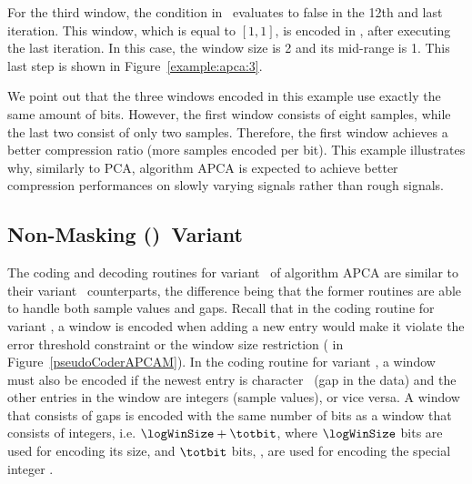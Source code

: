 For the third window, the condition in \Line \APCACodeOne\ evaluates to false in the 12th and last iteration. This window, which is equal to $[1, 1]$, is encoded in \Line \APCACodeTwo, after executing the last iteration. In this case, the window size is 2 and its mid-range is 1. This last step is shown in Figure~\ref{example:apca:3}.




We point out that the three windows encoded in this example use exactly the same amount of bits. However, the first window consists of eight samples, while the last two consist of only two samples. Therefore, the first window achieves a better compression ratio (more samples encoded per bit). This example illustrates why, similarly to PCA, algorithm APCA is expected to achieve better compression performances on slowly varying signals rather than rough signals.




\clearpage
\subsection{Non-Masking (\NOmaskalgo)\ Variant}
\label{algo:apca:nmvariant}


The coding and decoding routines for variant \NOmaskalgo\ of algorithm APCA are similar to their variant \maskalgo\ counterparts, the difference being that the former routines are able to handle both sample values and gaps. Recall that in the coding routine for variant \maskalgo, a window is encoded when adding a new entry would make it violate the error threshold constraint or the window size restriction ( in Figure~\ref{pseudoCoderAPCAM}). In the coding routine for variant \NOmaskalgo, a window must also be encoded if the newest entry is character \noData\ (gap in the data) and the other entries in the window are integers (sample values), or vice versa. A window that consists of gaps is encoded with the same number of bits as a window that consists of integers, i.e. $\logWinSize+\totbit$, where $\logWinSize$ bits are used for encoding its size, and $\totbit$ bits, \wheretotbit, are used for encoding the special integer \nodata.

